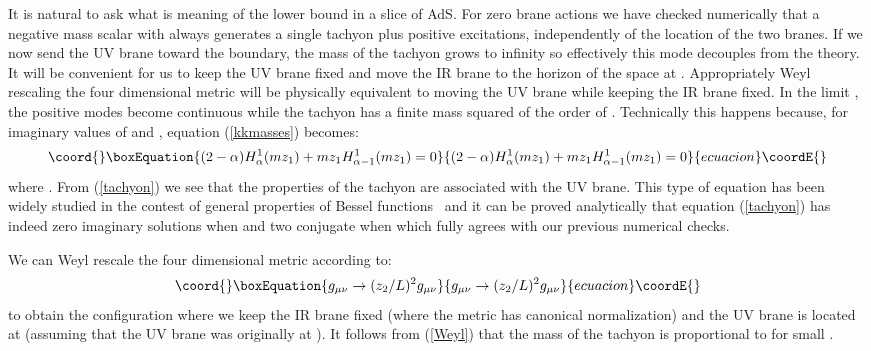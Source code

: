 \documentclass[a4paper,12pt,dvips]{article}
\begin{document}
It is natural to ask what is meaning of the lower bound in a slice
of AdS. For zero brane actions we have checked numerically that a
negative mass scalar with \coordHE{} always generates a
single \coordHE{} tachyon plus positive excitations, independently of
the location of the two branes. If we now send the UV brane toward
the boundary, the mass of the tachyon grows to infinity so
effectively this mode decouples from the theory. It will be
convenient for us to keep the UV brane fixed and move the IR brane
to the horizon of the space at \coordHE{}. Appropriately Weyl
rescaling the four dimensional metric will be physically
equivalent to moving the UV brane while keeping the IR brane
fixed. In the limit \coordHE{}, the positive modes become
continuous while the tachyon has a finite mass squared of the
order of \coordHE{}. Technically this happens because, for
imaginary values of \coordHE{} and \coordHE{}, equation
(\ref{kkmasses}) becomes:
\begin{equation}\coord{}\boxEquation{
(2-\alpha)H^1_\alpha(m z_1)+ m z_1 H^1_{\alpha - 1}(m z_1)=0
\label{tachyon}
}{
(2-\alpha)H^1_\alpha(m z_1)+ m z_1 H^1_{\alpha - 1}(m z_1)=0
}{ecuacion}\coordE{}\end{equation}
where \coordHE{}. From
(\ref{tachyon}) we see that the properties of the tachyon are
associated with the UV brane. This type of equation has been
widely studied in the contest of general properties of Bessel
functions~\cite{bessel} and it can be proved analytically that
equation (\ref{tachyon}) has indeed zero imaginary solutions when
\coordHE{} and two conjugate when \coordHE{} which fully
agrees with our previous numerical checks.

 We
can Weyl rescale the four dimensional metric according to:
\begin{equation}\coord{}\boxEquation{
g_{\mu \nu} \to (z_2/L)^2g_{\mu \nu}
\label{Weyl}
}{
g_{\mu \nu} \to (z_2/L)^2g_{\mu \nu}
}{ecuacion}\coordE{}\end{equation}
to obtain the configuration where we keep the IR brane fixed
(where the \coordHE{} metric has canonical normalization) and the UV
brane is located at \coordHE{} (assuming that the UV brane
was originally at \coordHE{}). It follows from (\ref{Weyl}) that the
mass of the tachyon is proportional to \coordHE{} for small \coordHE{}.
\end{document}

